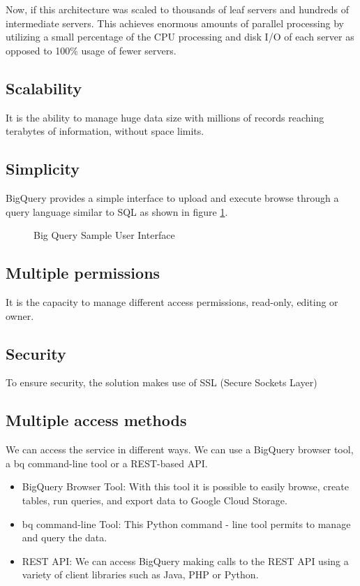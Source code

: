 \documentclass[9pt,twocolumn,twoside]{../../styles/osajnl}
\begin{document}
\noindent
Now, if this architecture was scaled to thousands of leaf servers and
hundreds of intermediate servers. This achieves enormous amounts of
parallel processing by utilizing a small percentage of the CPU
processing and disk I/O of each server as opposed to 100\% usage of
fewer servers.

\subsection{Scalability}
It is the ability to manage huge data size with millions of records
reaching terabytes of information, without space limits\cite{www-bigquery}.

\subsection{Simplicity}
BigQuery provides a simple interface to upload and execute browse
through a query language similar to SQL as shown in figure \ref{fig:bigqueryinterface}.

\begin{figure}[htbp]
\centering
{}
\caption{\cite{www-userinterface-bigquery} Big Query Sample User Interface}
\label{fig:bigqueryinterface}
\end{figure}

\subsection{Multiple permissions}
It is the capacity to manage different access permissions, read-only,
editing or owner.

\subsection{Security}
To ensure security, the solution makes use of SSL (Secure Sockets Layer)

\subsection{Multiple access methods}
We can access the service in different ways. We can use a BigQuery
browser tool, a bq command-line tool or a REST-based
API. \begin{itemize}
\item BigQuery Browser Tool: With this tool it is possible to easily browse,
create tables, run queries, and export data to Google Cloud Storage.
\item bq command-line Tool: This Python command - line tool permits to
  manage and query the data. \item REST API: We can access BigQuery
  making calls to the REST API using a variety of client libraries
  such as Java, PHP or Python.  \end{itemize}
\end{document}
